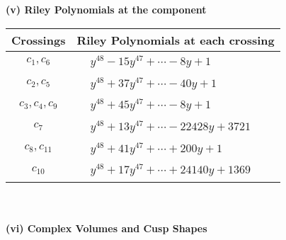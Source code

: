 \documentclass[1p]{elsarticle_modified}
\theoremstyle{definition}
\begin{document}
\newpage\renewcommand{\arraystretch}{1}
\flushleft \textbf{(v) Riley Polynomials at the component}\newline \\
\begin{tabular}{m{50pt}|m{274pt}}
Crossings & \hspace{64pt}Riley Polynomials at each crossing \\
\hline $$\begin{aligned}c_{1},c_{6}\end{aligned}$$&$\begin{aligned}
&y^{48}-15 y^{47}+\cdots-8 y+1
\end{aligned}$\\
\hline $$\begin{aligned}c_{2},c_{5}\end{aligned}$$&$\begin{aligned}
&y^{48}+37 y^{47}+\cdots-40 y+1
\end{aligned}$\\
\hline $$\begin{aligned}c_{3},c_{4},c_{9}\end{aligned}$$&$\begin{aligned}
&y^{48}+45 y^{47}+\cdots-8 y+1
\end{aligned}$\\
\hline $$\begin{aligned}c_{7}\end{aligned}$$&$\begin{aligned}
&y^{48}+13 y^{47}+\cdots-22428 y+3721
\end{aligned}$\\
\hline $$\begin{aligned}c_{8},c_{11}\end{aligned}$$&$\begin{aligned}
&y^{48}+41 y^{47}+\cdots+200 y+1
\end{aligned}$\\
\hline $$\begin{aligned}c_{10}\end{aligned}$$&$\begin{aligned}
&y^{48}+17 y^{47}+\cdots+24140 y+1369
\end{aligned}$\\
\hline
\end{tabular}\\~\\
\newpage\flushleft \textbf{(vi) Complex Volumes and Cusp Shapes}
\end{document}
